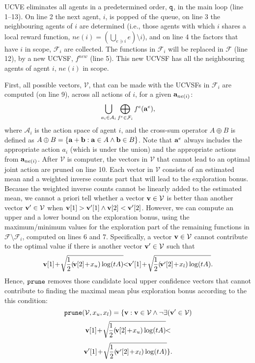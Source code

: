 \documentclass{article}
\begin{document}
UCVE eliminates all agents in a predetermined order, $\tt q$, in the main loop (line 1--13). On line 2 the next agent, $i$, is popped of the queue, on line 3 the neighbouring agents of $i$ are determined (i.e., those agents with which $i$ shares a local reward function, $ne(i) = (\bigcup_{e\ni i} e) \setminus i$), and on line 4 the factors that have $i$ in scope, $\mathcal{F}_i$ are collected. The functions in $\mathcal{F}_i$ will be replaced in $\mathcal{F}$ (line 12), by a new UCVSF, $f^{new}$ (line 5). This new UCVSF has all the neighbouring agents of agent $i$, $ne(i)$ in scope. 

First, all possible vectors, $\mathcal{V}$, that can be made with the UCVSFs in $\mathcal{F}_i$ are computed (on line 9), across all actions of $i$, for a given ${\bf a}_{ne(i)}$: 
\[\bigcup_{a_i\in\mathcal{A}_i} \bigoplus_{f^e\in \mathcal{F}_i} f^e({\bf a}^e),
\]
where $\mathcal{A}_i$ is the action space of agent $i$, and the cross-sum operator $A \oplus B$ is defined as $A \oplus B = \{ {\bf a} + {\bf b} : {\bf a}\in A \wedge {\bf b} \in B\}$.  Note that ${\bf a}^e$ always includes the appropriate action $a_i$ (which is under the union) and the appropriate actions from ${\bf a}_{ne(i)}$.  After $\mathcal{V}$ is computer, the vectors in $\mathcal{V}$ that cannot lead to an optimal joint action are pruned on line 10. Each vector in $\mathcal{V}$ consists of an estimated mean and a weighted inverse counts part that will lead to the exploration bonus. Because the weighted inverse counts  cannot be linearly added to the estimated mean, we cannot a priori tell whether a vector ${\bf v} \in \mathcal{V}$ is better than  another vector ${\bf v}' \in \mathcal{V}$ when ${\bf v}[1]>{\bf v}'[1] \wedge {\bf v}[2]<{\bf v}'[2]$. 
However, we can compute an upper and a lower bound on the exploration bonus, using the maximum/minimum values for the exploration part of the remaining functions in $\mathcal{F} \setminus \mathcal{F}_i$, computed on lines 6 and 7. Specifically, a vector ${\bf v} \in \mathcal{V}$ cannot contribute to the optimal value if there is another vector ${\bf v}' \in \mathcal{V}$ such that
\[
	{\bf v}[1]\!+\!\sqrt{\!\frac{1}{2}  (\!{\bf v}[2]\!+\!x_u) \log ( t A )}\!\! <\!\! {\bf v}'[1]\!+\! \sqrt{\!\frac{1}{2}  (\!{\bf v}'[2]\!+\!x_l) \log ( t A )}.
	\]
Hence, $\tt prune$ removes those candidate local upper confidence vectors that cannot contribute to finding the maximal mean plus exploration bonus according to the this condition:
\[
{\tt prune}(\mathcal{V}, x_u, x_l) =  \{ {\bf v} : {\bf v} \in \mathcal{V} \wedge \neg\exists ({\bf v}' \in \mathcal{V}) \]
\[
{\bf v}[1]\!+\!\sqrt{\!\frac{1}{2}  (\!{\bf v}[2]\!+\!x_u) \log ( t A )}\!\! <
\]
\[
{\bf v}'[1]\!+\! \sqrt{\!\frac{1}{2}  (\!{\bf v}'[2]\!+\!x_l) \log ( t A )} \}.
\]
\end{document}
